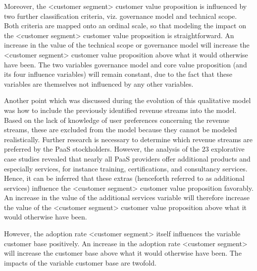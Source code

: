 Moreover, the <customer segment> customer value proposition is influenced by two further classification criteria, viz. governance model and technical scope. Both criteria are mapped onto an ordinal scale, so that modeling the impact on the <customer segment> customer value proposition is straightforward. An increase in the value of the technical scope or governance model will increase the <customer segment> customer value proposition above what it would otherwise have been. The two variables governance model and core value proposition (and its four influence variables) will remain constant, due to the fact that these variables are themselves not influenced by any other variables.

Another point which was discussed during the 	evolution of this qualitative model was how to include the previously identified revenue streams into the model. Based on the lack of knowledge of user preferences concerning the revenue streams, these are excluded from the model because they cannot be modeled realistically. Further research is necessary to determine which revenue streams are preferred by the \ac{PaaS} stockholders. However, the analysis of the 23 explorative case studies revealed that nearly all \ac{PaaS} providers offer additional products and especially services, for instance training, certifications, and consultancy services. Hence, it can be inferred that these extras (henceforth referred to as additional services) influence the <customer segment> customer value proposition favorably. An increase in the value of the additional services variable will therefore increase the value of the <customer segment> customer value proposition above what it would otherwise have been.

However, the adoption rate <customer segment> itself influences the variable customer base positively. An increase in the adoption rate <customer segment> will increase the customer base above what it would otherwise have been. The impacts of the variable customer base are twofold. 


